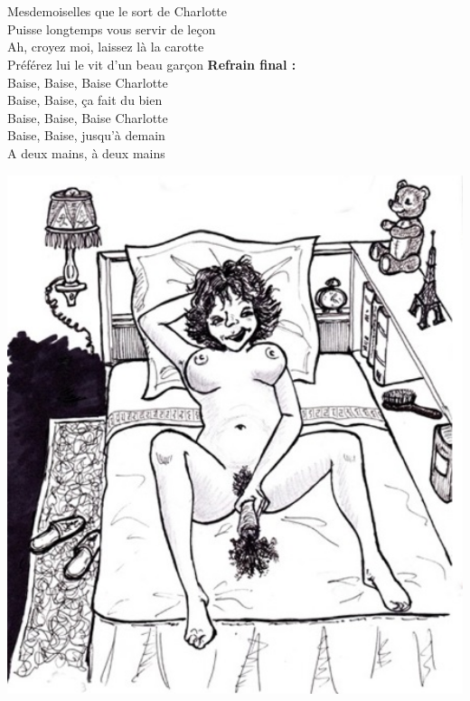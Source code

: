 \\\\Mesdemoiselles que le sort de Charlotte
\\Puisse longtemps vous servir de leçon
\\Ah, croyez moi, laissez là la carotte
\\Préférez lui le vit d'un beau garçon
\breakpage
\textbf{Refrain final :}
\\Baise, Baise, Baise Charlotte
\\Baise, Baise, ça fait du bien
\\Baise, Baise, Baise Charlotte
\\Baise, Baise, jusqu'à demain
\\A deux mains, à deux mains
\\
\begin{center}
\includegraphics[width=1\textwidth]{images/charlotte.jpg}
\end{center}

\breakpage